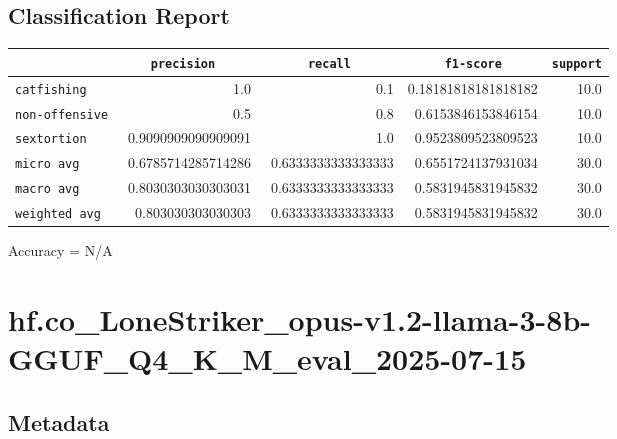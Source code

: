 \documentclass{article}
\begin{document}
\subsection{Classification Report}

\begin{center}
\begin{tabular}{l | r | r | r | r} \hline
    \verb|            | & \verb|    precision     | & \verb|      recall      | & \verb|     f1-score     | & \verb|support| \\ \hline
    \hline
    \verb|catfishing | & 1.0 & 0.1 & 0.18181818181818182 &    10.0 \\ \hline
    \verb|non-offensive| & 0.5 & 0.8 & 0.6153846153846154 &    10.0 \\ \hline
    \verb|sextortion | & 0.9090909090909091 & 1.0 & 0.9523809523809523 &    10.0 \\ \hline
    \verb|micro avg  | & 0.6785714285714286 & 0.6333333333333333 & 0.6551724137931034 &    30.0 \\ \hline
    \verb|macro avg  | & 0.8030303030303031 & 0.6333333333333333 & 0.5831945831945832 &    30.0 \\ \hline
    \verb|weighted avg| & 0.803030303030303 & 0.6333333333333333 & 0.5831945831945832 &    30.0 \\ \hline
\end{tabular}
\end{center}

\begin{center}
Accuracy = N/A
\end{center}

\section{hf.co\_LoneStriker\_opus-v1.2-llama-3-8b-GGUF\_Q4\_K\_M\_eval\_2025-07-15}
\subsection{Metadata}
\end{document}
